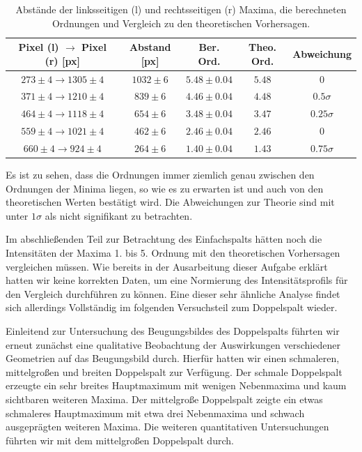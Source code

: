 \begin{table}[H]
  \centering
  \caption{Abstände der linksseitigen (l) und rechtsseitigen (r) Maxima, die berechneten Ordnungen und Vergleich zu den theoretischen Vorhersagen.}
  \vspace*{0.5em}
  \begin{tabular}{c|c|c|c|c}
    Pixel (l) $\to$ Pixel (r) [px] & Abstand [px] & Ber. Ord. & Theo. Ord. & Abweichung\\\hline
    $273 \pm 4 \to 1305 \pm 4$ & $1032 \pm 6$ & $5.48 \pm 0.04$ & $5.48$ & $0$\\
    $371 \pm 4 \to 1210 \pm 4$ & $839 \pm 6$ & $4.46 \pm 0.04$ & $4.48$ & $0.5\sigma$\\
    $464 \pm 4 \to 1118 \pm 4$ & $654 \pm 6$ & $3.48 \pm 0.04$ & $3.47$ & $0.25\sigma$\\
    $559 \pm 4 \to 1021 \pm 4$ & $462 \pm 6$ & $2.46 \pm 0.04$ & $2.46$ & $0$\\
    $660 \pm 4 \to 924 \pm 4$ & $264 \pm 6$ & $1.40 \pm 0.04$ & $1.43$ & $0.75\sigma$
  \end{tabular}
  \label{tab:es_maxima_ord_ber_vergl_zsmf}
\end{table}

Es ist zu sehen, dass die Ordnungen immer ziemlich genau zwischen den Ordnungen der Minima liegen, so wie es zu erwarten ist und auch von den theoretischen Werten bestätigt wird. Die Abweichungen zur Theorie sind mit unter $1\sigma$ als nicht signifikant zu betrachten.

Im abschließenden Teil zur Betrachtung des Einfachspalts hätten noch die Intensitäten der Maxima 1. bis 5. Ordnung mit den theoretischen Vorhersagen vergleichen müssen. Wie bereits in der Ausarbeitung dieser Aufgabe erklärt hatten wir keine korrekten Daten, um eine Normierung des Intensitätsprofils für den Vergleich durchführen zu können. Eine dieser sehr ähnliche Analyse findet sich allerdings Vollständig im folgenden Versuchsteil zum Doppelspalt wieder.

Einleitend zur Untersuchung des Beugungsbildes des Doppelspalts führten wir erneut zunächst eine qualitative Beobachtung der Auswirkungen verschiedener Geometrien auf das Beugungsbild durch. Hierfür hatten wir einen schmaleren, mittelgroßen und breiten Doppelspalt zur Verfügung. Der schmale Doppelspalt erzeugte ein sehr breites Hauptmaximum mit wenigen Nebenmaxima und kaum sichtbaren weiteren Maxima. Der mittelgroße Doppelspalt zeigte ein etwas schmaleres Hauptmaximum mit etwa drei Nebenmaxima und schwach ausgeprägten weiteren Maxima. Die weiteren quantitativen Untersuchungen führten wir mit dem mittelgroßen Doppelspalt durch.

